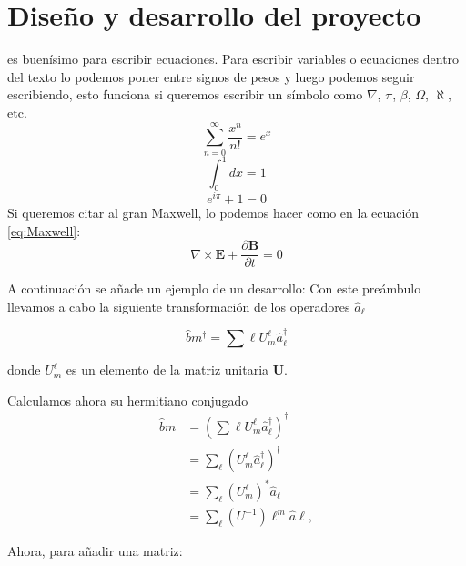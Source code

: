 \documentclass[a4paper]{article}
\begin{document}
\section{Diseño y desarrollo del proyecto}

es buenísimo para escribir ecuaciones. Para escribir variables o ecuaciones dentro del texto lo podemos poner entre signos de pesos y luego podemos seguir escribiendo,
esto funciona si queremos escribir un símbolo como $\nabla$, $\pi$, $\beta$, $\Omega$, $\aleph$, etc.
\begin{equation}
\sum_{n=0}^\infty \frac{x^n}{n!}=e^x
\end{equation}
\begin{equation}
\int_{0}^{1}dx=1
\end{equation}
\begin{equation}
e^{i\pi}+1=0
\end{equation}
Si queremos citar al gran Maxwell, lo podemos hacer como en la ecuación \ref{eq:Maxwell}:
\begin{equation}
\nabla\times\mathbf{E}+\frac{\partial\mathbf{B}}{\partial t}=0\label{eq:Maxwell}
\end{equation}

A continuación se añade un ejemplo de un desarrollo:
Con este preámbulo llevamos a cabo la siguiente transformación de los operadores $\hat{a}_{\ell}$

\begin{equation}
\hat{b}{m}^{\dagger}=\sum{\ell}U_{m}^{\ell}\hat{a}_{\ell}^{\dagger}
\end{equation}

donde $U_{m}^{\ell}$ es un elemento de la matriz unitaria $\mathbf{U}$.

Calculamos ahora su hermitiano conjugado
\begin{align}
\hat{b}{m} & =\left(\sum{\ell}U_{m}^{\ell}\hat{a}_{\ell}^{\dagger}\right)^{\dagger}\label{eq:bm}\\
 & =\sum_{\ell}\left(U_{m}^{\ell}\hat{a}_{\ell}^{\dagger}\right)^{\dagger}\nonumber \\
 & =\sum_{\ell}\left(U_{m}^{\ell}\right)^{*}\hat{a}_{\ell}\nonumber \\
 & =\sum_{\ell}\left(U^{-1}\right){\ell}^{m}\hat{a}{\ell},\label{eq:bSubM}
\end{align}

Ahora, para añadir una matriz:
\end{document}
